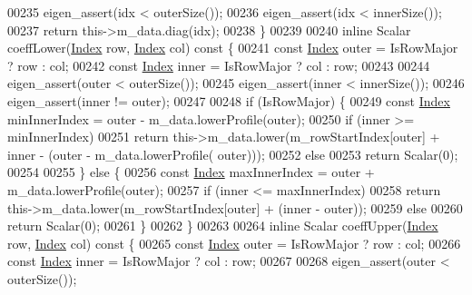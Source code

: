 \begin{DoxyCode}
00235         eigen\_assert(idx < outerSize());
00236         eigen\_assert(idx < innerSize());
00237         \textcolor{keywordflow}{return} this->m\_data.diag(idx);
00238     \}
00239 
00240     \textcolor{keyword}{inline} Scalar coeffLower(\hyperlink{group___core___module_a554f30542cc2316add4b1ea0a492ff02}{Index} row, \hyperlink{group___core___module_a554f30542cc2316add4b1ea0a492ff02}{Index} col)\textcolor{keyword}{ const }\{
00241         \textcolor{keyword}{const} \hyperlink{group___core___module_a554f30542cc2316add4b1ea0a492ff02}{Index} outer = IsRowMajor ? row : col;
00242         \textcolor{keyword}{const} \hyperlink{group___core___module_a554f30542cc2316add4b1ea0a492ff02}{Index} inner = IsRowMajor ? col : row;
00243 
00244         eigen\_assert(outer < outerSize());
00245         eigen\_assert(inner < innerSize());
00246         eigen\_assert(inner != outer);
00247 
00248         \textcolor{keywordflow}{if} (IsRowMajor) \{
00249             \textcolor{keyword}{const} \hyperlink{group___core___module_a554f30542cc2316add4b1ea0a492ff02}{Index} minInnerIndex = outer - m\_data.lowerProfile(outer);
00250             \textcolor{keywordflow}{if} (inner >= minInnerIndex)
00251                 \textcolor{keywordflow}{return} this->m\_data.lower(m\_rowStartIndex[outer] + inner - (outer - m\_data.lowerProfile(
      outer)));
00252             \textcolor{keywordflow}{else}
00253                 \textcolor{keywordflow}{return} Scalar(0);
00254 
00255         \} \textcolor{keywordflow}{else} \{
00256             \textcolor{keyword}{const} \hyperlink{group___core___module_a554f30542cc2316add4b1ea0a492ff02}{Index} maxInnerIndex = outer + m\_data.lowerProfile(outer);
00257             \textcolor{keywordflow}{if} (inner <= maxInnerIndex)
00258                 \textcolor{keywordflow}{return} this->m\_data.lower(m\_rowStartIndex[outer] + (inner - outer));
00259             \textcolor{keywordflow}{else}
00260                 \textcolor{keywordflow}{return} Scalar(0);
00261         \}
00262     \}
00263 
00264     \textcolor{keyword}{inline} Scalar coeffUpper(\hyperlink{group___core___module_a554f30542cc2316add4b1ea0a492ff02}{Index} row, \hyperlink{group___core___module_a554f30542cc2316add4b1ea0a492ff02}{Index} col)\textcolor{keyword}{ const }\{
00265         \textcolor{keyword}{const} \hyperlink{group___core___module_a554f30542cc2316add4b1ea0a492ff02}{Index} outer = IsRowMajor ? row : col;
00266         \textcolor{keyword}{const} \hyperlink{group___core___module_a554f30542cc2316add4b1ea0a492ff02}{Index} inner = IsRowMajor ? col : row;
00267 
00268         eigen\_assert(outer < outerSize());

\end{DoxyCode}
